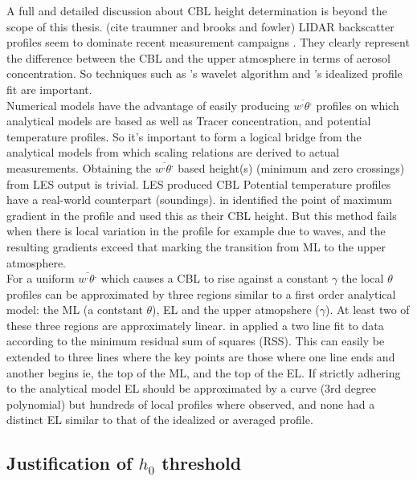 A full and detailed discussion about \acs{CBL} height determination is beyond the scope of this
thesis. (cite traumner and brooks and fowler) LIDAR backscatter profiles seem to dominate recent 
measurement campaigns \cite{Traum11}.  They clearly represent the difference between the \acs{CBL} 
and the upper atmosphere in terms of aerosol concentration.  So techniques such as 
\citeauthor{BrooksFowler2}'s wavelet algorithm and \citeauthor{SteynBaldHoff}'s idealized profile 
fit are important.\\

Numerical models have the advantage of easily producing $\overline{w^{,}\theta^{,}}$ profiles
on which analytical models are based as well as Tracer concentration, and potential temperature profiles.
So it's important to form a logical bridge from the analytical models from which scaling relations
are derived to actual measurements. Obtaining the $\overline{w^{,}\theta^{,}}$ based height(s) (minimum and zero
crossings) from LES output is trivial.  LES produced \acs{CBL} Potential temperature profiles have a 
real-world counterpart (soundings).  \citeauthor{SullMoengStev} in \cite{SullMoengStev} identified the 
point of maximum gradient in the profile and used this as their \acs{CBL} height.  But this method
fails when there is local variation in the profile for example due to waves, and the resulting
gradients exceed that marking the transition from \acs{ML} to the upper atmosphere.\\

For a uniform $\overline{w^{,}\theta^{,}}$ which causes a \acs{CBL} to rise against a constant $\gamma$
the local $\theta$ profiles can be approximated by three regions similar to a first order analytical model:
the \acs{ML} (a contstant $\theta$), \acs{EL} and the upper atmopshere ($\gamma$).  At least two 
of these three regions are approximately linear.  \citeauthor{Vieth} in \cite{Vieth} applied a two line
fit to data according to the minimum residual sum of squares (\acs{RSS}).  This can easily be extended
to three lines where the key points are those where one line ends and another begins ie, the top of the 
\acs{ML}, and the top of the \acs{EL}.  If strictly adhering to the analytical model \acs{EL} should be
approximated by a curve (3rd degree polynomial) but hundreds of local profiles where observed, and none
had a distinct \acs{EL} similar to that of the idealized or averaged profile.\\

\subsection{Justification of $h_{0}$ threshold}

